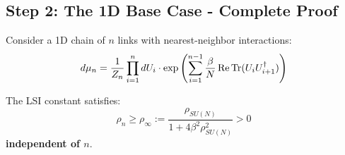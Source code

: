 \subsection{Step 2: The 1D Base Case - Complete Proof}

\begin{theorem}
\label{thm:1d-chain-uniform}
Consider a 1D chain of $n$ links with nearest-neighbor interactions:
\[
d\mu_n = \frac{1}{Z_n} \prod_{i=1}^{n} dU_i \cdot \exp\left(\sum_{i=1}^{n-1} \frac{\beta}{N} \operatorname{Re}\operatorname{Tr}(U_i U_{i+1}^\dagger)\right)
\]

The LSI constant satisfies:
\[
\boxed{\rho_n \geq \rho_\infty := \frac{\rho_{SU(N)}}{1 + 4\beta^2 \rho_{SU(N)}^2} > 0}
\]
\textbf{independent of $n$}.
\end{theorem}

